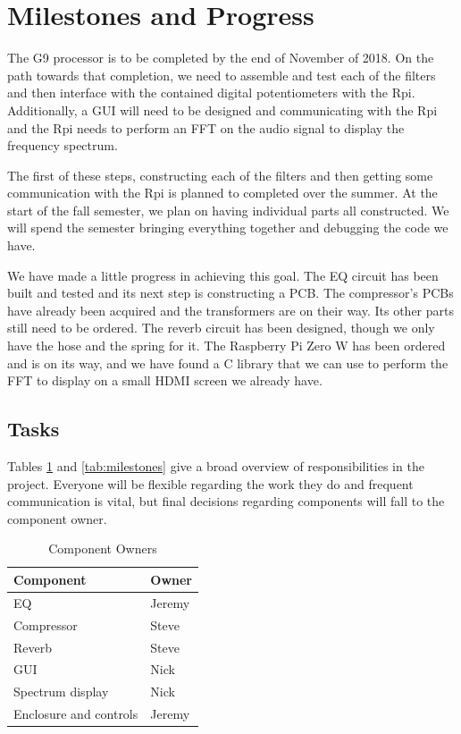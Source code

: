 \documentclass[journal]{IEEEtran}
\begin{document}
	\section{Milestones and Progress}
	The G9 processor is to be completed by the end of November of 2018.  On the path towards that completion, we need to assemble and test each of the filters and then interface with the contained digital potentiometers with the Rpi.  Additionally, a GUI will need to be designed and communicating with the Rpi and the Rpi needs to perform an FFT on the audio signal to display the frequency spectrum.  
	
	The first of these steps, constructing each of the filters and then getting some communication with the Rpi is planned to completed over the summer.  At the start of the fall semester, we plan on having individual parts all constructed.  We will spend the semester bringing everything together and debugging the code we have.
	
	We have made a little progress in achieving this goal.  The EQ circuit has been built and tested and its next step is constructing a PCB.  The compressor's PCBs have already been acquired and the transformers are on their way.  Its other parts still need to be ordered.  The reverb circuit has been designed, though we only have the hose and the spring for it.  The Raspberry Pi Zero W has been ordered and is on its way, and we have found a C library that we can use to perform the FFT to display on a small HDMI screen we already have.
	
	\subsection{Tasks}
	
	Tables \ref{tab:owners} and \ref{tab:milestones} give a broad overview of responsibilities in the project. Everyone will be flexible regarding the work they do and frequent communication is vital, but final decisions regarding components will fall to the component owner.
	
	\begin{table}[]
		\centering
		\caption{Component Owners}
		\label{tab:owners}
		\begin{tabular}{l|l}
			Component                     & Owner \\ \hline
			EQ                     & Jeremy \\
			Compressor             & Steve  \\
			Reverb                 & Steve  \\
			GUI                    & Nick   \\
			Spectrum display       & Nick   \\
			Enclosure and controls & Jeremy
		\end{tabular}
	\end{table}
\end{document}
